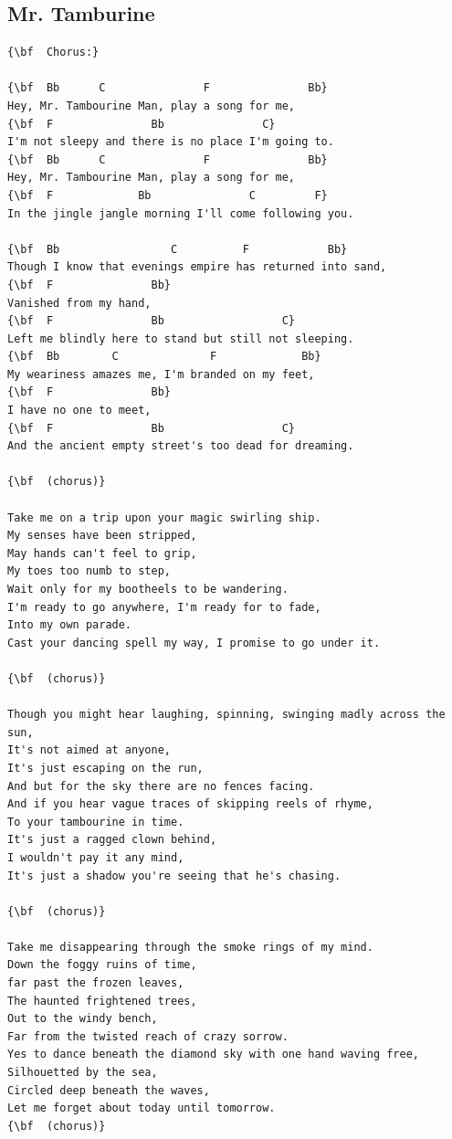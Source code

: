 \documentclass[a4paper]{article}
\begin{document}
\subsection{Mr. Tamburine}
\begin{Verbatim}[commandchars=\\\{\}]
{\bf  Chorus:}

{\bf  Bb      C               F               Bb}
Hey, Mr. Tambourine Man, play a song for me,
{\bf  F               Bb               C}
I'm not sleepy and there is no place I'm going to.
{\bf  Bb      C               F               Bb}
Hey, Mr. Tambourine Man, play a song for me,
{\bf  F             Bb               C         F}
In the jingle jangle morning I'll come following you.

{\bf  Bb                 C          F            Bb}
Though I know that evenings empire has returned into sand,
{\bf  F               Bb}
Vanished from my hand,
{\bf  F               Bb                  C}
Left me blindly here to stand but still not sleeping.
{\bf  Bb        C              F             Bb}
My weariness amazes me, I'm branded on my feet,
{\bf  F               Bb}
I have no one to meet,
{\bf  F               Bb                  C}
And the ancient empty street's too dead for dreaming.

{\bf  (chorus)}

Take me on a trip upon your magic swirling ship.
My senses have been stripped,
May hands can't feel to grip,
My toes too numb to step,
Wait only for my bootheels to be wandering.
I'm ready to go anywhere, I'm ready for to fade,
Into my own parade.
Cast your dancing spell my way, I promise to go under it.

{\bf  (chorus)}

Though you might hear laughing, spinning, swinging madly across the sun,
It's not aimed at anyone,
It's just escaping on the run,
And but for the sky there are no fences facing.
And if you hear vague traces of skipping reels of rhyme,
To your tambourine in time.
It's just a ragged clown behind,
I wouldn't pay it any mind,
It's just a shadow you're seeing that he's chasing.

{\bf  (chorus)}

Take me disappearing through the smoke rings of my mind.
Down the foggy ruins of time,
far past the frozen leaves,
The haunted frightened trees,
Out to the windy bench,
Far from the twisted reach of crazy sorrow.
Yes to dance beneath the diamond sky with one hand waving free,
Silhouetted by the sea,
Circled deep beneath the waves,
Let me forget about today until tomorrow.
{\bf  (chorus)}

\end{Verbatim}
\newpage
\end{document}
